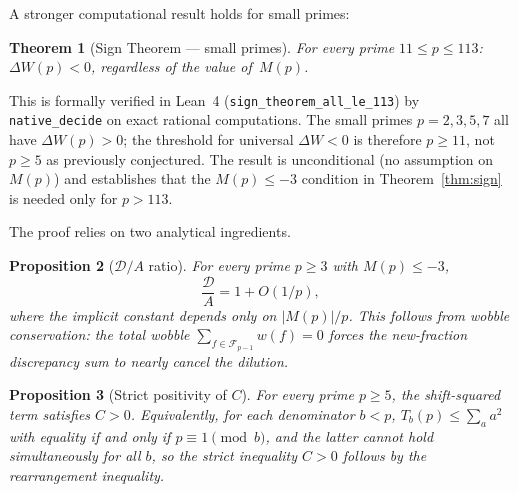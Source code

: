 \documentclass[11pt]{article}
\newtheorem{theorem}{Theorem}[section]
\newtheorem{proposition}[theorem]{Proposition}
\theoremstyle{definition}
\newcommand{\F}{\mathcal{F}}
\begin{document}
A stronger computational result holds for small primes:

\begin{theorem}[Sign Theorem --- small primes]\label{thm:sign-small}
For every prime $11 \le p \le 113$:
$\Delta W(p) < 0$,
regardless of the value of~$M(p)$.
\end{theorem}

\noindent This is formally verified in Lean~4
(\texttt{sign\_theorem\_all\_le\_113}) by
\texttt{native\_decide} on exact rational computations.
The small primes $p = 2, 3, 5, 7$ all have $\Delta W(p) > 0$;
the threshold for universal $\Delta W < 0$ is therefore
$p \ge 11$, not $p \ge 5$ as previously conjectured.
The result is unconditional (no assumption on~$M(p)$) and
establishes that the $M(p) \le -3$ condition in
Theorem~\ref{thm:sign} is needed only for $p > 113$.

The proof relies on two analytical ingredients.

\begin{proposition}[$\mathcal{D}/A$ ratio]\label{prop:DA-ratio}
For every prime $p \ge 3$ with $M(p) \le -3$,
\[
  \frac{\mathcal{D}}{A} = 1 + O(1/p),
\]
where the implicit constant depends only on $|M(p)|/p$.
This follows from wobble conservation: the total wobble
$\sum_{f \in \F_{p-1}} w(f) = 0$ forces the new-fraction
discrepancy sum to nearly cancel the dilution.
\end{proposition}

\begin{proposition}[Strict positivity of $C$]\label{prop:strict-pos}
For every prime $p \ge 5$, the shift-squared term satisfies $C > 0$.
Equivalently, for each denominator $b < p$,
$T_b(p) \le \sum_{a} a^2$ with equality if and only if
$p \equiv 1 \pmod{b}$, and the latter cannot hold simultaneously
for all $b$, so the strict inequality $C > 0$ follows by the
rearrangement inequality.
\end{proposition}
\end{document}
